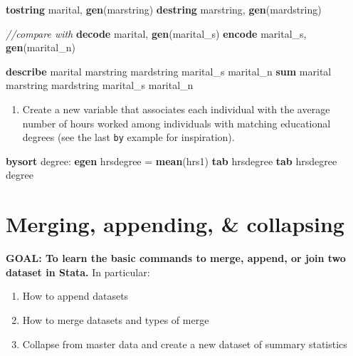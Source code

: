 \documentclass[
]{book}
\newenvironment{Shaded}{\begin{snugshade}}{\end{snugshade}}
\newcommand{\CommentTok}[1]{\textcolor[rgb]{0.56,0.35,0.01}{\textit{#1}}}
\newcommand{\KeywordTok}[1]{\textcolor[rgb]{0.13,0.29,0.53}{\textbf{#1}}}
\newcommand{\NormalTok}[1]{#1}
\providecommand{\tightlist}{%
  \setlength{\itemsep}{0pt}\setlength{\parskip}{0pt}}
\begin{document}
\begin{Shaded}
\begin{Highlighting}[]
\KeywordTok{tostring}\NormalTok{ marital, }\KeywordTok{gen}\NormalTok{(marstring)}
\KeywordTok{destring}\NormalTok{ marstring, }\KeywordTok{gen}\NormalTok{(mardstring)}

\CommentTok{//compare with}
\KeywordTok{decode}\NormalTok{ marital, }\KeywordTok{gen}\NormalTok{(marital\_s)}
\KeywordTok{encode}\NormalTok{ marital\_s, }\KeywordTok{gen}\NormalTok{(marital\_n)}

\KeywordTok{describe}\NormalTok{ marital marstring mardstring marital\_s marital\_n}
\KeywordTok{sum}\NormalTok{ marital marstring mardstring marital\_s marital\_n}
\end{Highlighting}
\end{Shaded}

\begin{enumerate}
\def\labelenumi{\arabic{enumi}.}
\setcounter{enumi}{2}
\tightlist
\item
  Create a new variable that associates each individual with the average number of hours worked among individuals with matching educational degrees (see the last \texttt{by} example for inspiration).
\end{enumerate}

\begin{Shaded}
\begin{Highlighting}[]
\KeywordTok{bysort}\NormalTok{ degree: }\KeywordTok{egen}\NormalTok{ hrsdegree = }\KeywordTok{mean}\NormalTok{(hrs1)}
\KeywordTok{tab}\NormalTok{ hrsdegree}
\KeywordTok{tab}\NormalTok{ hrsdegree degree }
\end{Highlighting}
\end{Shaded}

\hypertarget{merging-appending-collapsing}{%
\section{Merging, appending, \& collapsing}\label{merging-appending-collapsing}}

\textbf{GOAL: To learn the basic commands to merge, append, or join two dataset in Stata.} In particular:

\begin{enumerate}
\def\labelenumi{\arabic{enumi}.}
\tightlist
\item
  How to append datasets
\item
  How to merge datasets and types of merge
\item
  Collapse from master data and create a new dataset of summary statistics
\end{enumerate}
\end{document}
